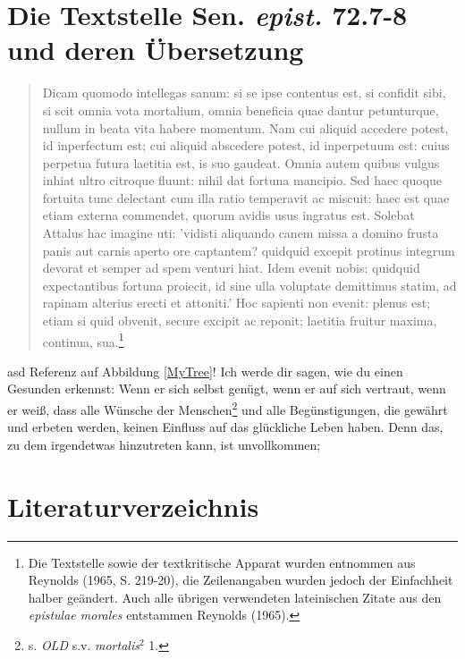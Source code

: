 \documentclass[12pt,a4paper]{article}
\begin{document}
\section{Die Textstelle Sen. \textit{epist.} 72.7-8 und deren Übersetzung}
\begin{singlespace}
\renewcommand\linenumberfont{\normalfont\small}
\begin{linenumbers}
\begin{quotation}
\selectfont
Dicam quomodo intellegas sanum: si se ipse contentus est, si confidit sibi, si scit omnia vota mortalium, omnia beneficia quae dantur petunturque, nullum in beata vita habere momentum. Nam cui aliquid accedere potest, id inperfectum est; cui aliquid abscedere potest, id inperpetuum est: cuius perpetua futura laetitia est, is suo gaudeat. Omnia autem quibus vulgus inhiat ultro citroque fluunt: nihil dat fortuna mancipio. Sed haec quoque fortuita tunc delectant cum illa ratio temperavit ac miscuit: haec est quae etiam externa commendet, quorum avidis usus ingratus est. Solebat Attalus hac imagine uti: 'vidisti aliquando canem missa a domino frusta panis aut carnis aperto ore captantem? quidquid excepit protinus integrum devorat et semper ad spem venturi hiat. Idem evenit nobis: quid\-quid expectantibus fortuna proiecit, id sine ulla voluptate demittimus statim, ad rapinam alterius erecti et attoniti.' Hoc sapienti non evenit: plenus est; etiam si quid obvenit, secure excipit ac reponit; laetitia fruitur maxima, continua, sua.\footnote{Die Textstelle sowie der textkritische Apparat wurden entnommen aus Reynolds (1965, S. 219-20), die Zeilenangaben wurden jedoch der Einfachheit halber geändert. Auch alle übrigen verwendeten lateinischen Zitate aus den \textit{epistulae morales} entstammen Reynolds (1965).}
\end{quotation}
\end{linenumbers}
\vspace{0.5cm}
\selectfont
asd
Referenz auf Abbildung \ref{MyTree}!
Ich werde dir sagen, wie du einen Gesunden erkennst: Wenn er sich selbst genügt, wenn er auf sich vertraut, wenn er weiß, dass alle Wünsche der Menschen\footnote{s. \textit{OLD} s.v. \textit{mortalis$^{2}$} 1.} und alle Begünstigungen, die gewährt und erbeten werden, keinen Einfluss auf das glückliche Leben haben. Denn das, zu dem irgendetwas hinzutreten kann, ist unvollkommen; 
\end{singlespace}
%
\pagebreak
\section*{Literaturverzeichnis}
\bibbycategory
{}
\end{document}
